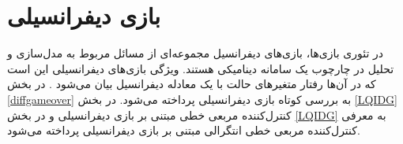 \chapter{ بازی دیفرانسیلی}
در تئوری بازی‌ها، بازی‌های دیفرانسیل مجموعه‌ای از مسائل مربوط به مدل‌سازی و تحلیل در چارچوب یک سامانه دینامیکی هستند. ویژگی بازی‌های دیفرانسیلی این است که در آن‌ها رفتار متغیرهای حالت با یک معادله دیفرانسیل بیان می‌شود
\cite{diff_game}.
در بخش
\ref{diffgameover}
به بررسی کوتاه بازی دیفرانسیلی پرداخته می‌شود. در بخش
\ref{LQIDG}
کنترل‌کننده مربعی خطی مبتنی بر بازی دیفرانسیلی
و در بخش
\ref{LQIDG}
به معرفی
کنترل‌کننده مربعی خطی انتگرالی مبتنی بر بازی دیفرانسیلی
پرداخته می‌شود.
